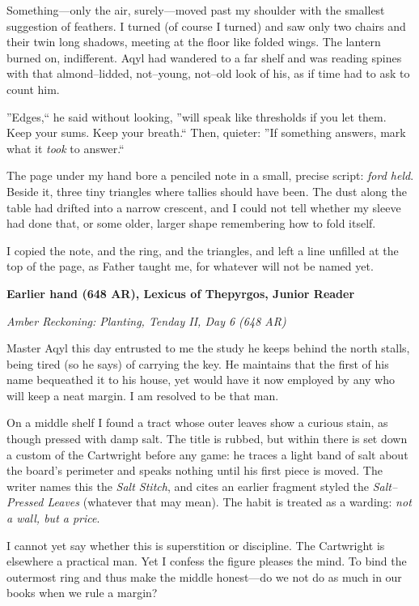 \documentclass[11pt]{article}
\numberwithin{equation}{section} %
\theoremstyle{plain} %
\theoremstyle{definition} %
\theoremstyle{remark} %
\begin{document}
Something---only the air, surely---moved past my shoulder with the smallest suggestion of feathers. I turned (of course I turned) and saw only two chairs and their twin long shadows, meeting at the floor like folded wings. The lantern burned on, indifferent. Aqyl had wandered to a far shelf and was reading spines with that almond--lidded, not--young, not--old look of his, as if time had to ask to count him.

''Edges,`` he said without looking, ''will speak like thresholds if you let them. Keep your sums. Keep your breath.`` Then, quieter: ''If something answers, mark what it \emph{took} to answer.``

The page under my hand bore a penciled note in a small, precise script: \textit{ford held}. Beside it, three tiny triangles where tallies should have been. The dust along the table had drifted into a narrow crescent, and I could not tell whether my sleeve had done that, or some older, larger shape remembering how to fold itself.

I copied the note, and the ring, and the triangles, and left a line unfilled at the top of the page, as Father taught me, for whatever will not be named yet.

\medskip

\noindent\textbf{Earlier hand (648 AR), Lexicus of Thepyrgos, Junior Reader}

\noindent\textit{Amber Reckoning: Planting, Tenday II, Day 6 (648 AR)}

Master Aqyl this day entrusted to me the study he keeps behind the north stalls, being tired (so he says) of carrying the key. He maintains that the first of his name bequeathed it to his house, yet would have it now employed by any who will keep a neat margin. I am resolved to be that man.

On a middle shelf I found a tract whose outer leaves show a curious stain, as though pressed with damp salt. The title is rubbed, but within there is set down a custom of the Cartwright before any game: he traces a light band of salt about the board's perimeter and speaks nothing until his first piece is moved. The writer names this the \textit{Salt Stitch}, and cites an earlier fragment styled the \textit{Salt--Pressed Leaves} (whatever that may mean). The habit is treated as a warding: \emph{not a wall, but a price}.

I cannot yet say whether this is superstition or discipline. The Cartwright is elsewhere a practical man. Yet I confess the figure pleases the mind. To bind the outermost ring and thus make the middle honest---do we not do as much in our books when we rule a margin?
\end{document}
